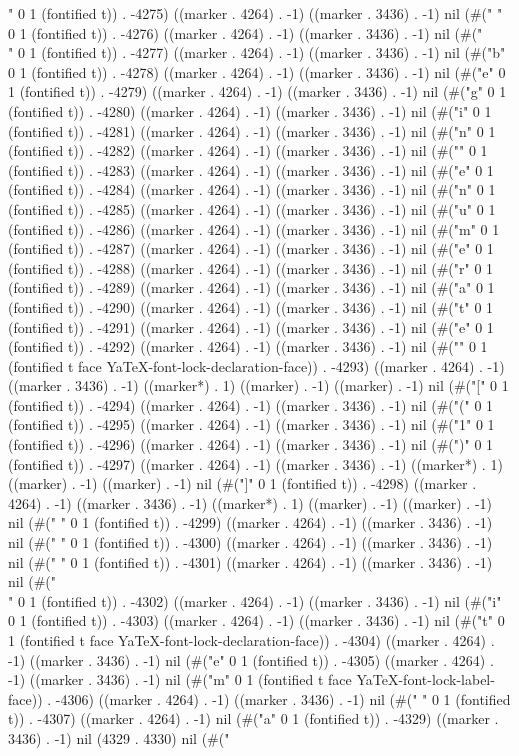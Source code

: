 " 0 1 (fontified t)) . -4275) ((marker . 4264) . -1) ((marker . 3436) . -1) nil (#(" " 0 1 (fontified t)) . -4276) ((marker . 4264) . -1) ((marker . 3436) . -1) nil (#("\\" 0 1 (fontified t)) . -4277) ((marker . 4264) . -1) ((marker . 3436) . -1) nil (#("b" 0 1 (fontified t)) . -4278) ((marker . 4264) . -1) ((marker . 3436) . -1) nil (#("e" 0 1 (fontified t)) . -4279) ((marker . 4264) . -1) ((marker . 3436) . -1) nil (#("g" 0 1 (fontified t)) . -4280) ((marker . 4264) . -1) ((marker . 3436) . -1) nil (#("i" 0 1 (fontified t)) . -4281) ((marker . 4264) . -1) ((marker . 3436) . -1) nil (#("n" 0 1 (fontified t)) . -4282) ((marker . 4264) . -1) ((marker . 3436) . -1) nil (#("{" 0 1 (fontified t)) . -4283) ((marker . 4264) . -1) ((marker . 3436) . -1) nil (#("e" 0 1 (fontified t)) . -4284) ((marker . 4264) . -1) ((marker . 3436) . -1) nil (#("n" 0 1 (fontified t)) . -4285) ((marker . 4264) . -1) ((marker . 3436) . -1) nil (#("u" 0 1 (fontified t)) . -4286) ((marker . 4264) . -1) ((marker . 3436) . -1) nil (#("m" 0 1 (fontified t)) . -4287) ((marker . 4264) . -1) ((marker . 3436) . -1) nil (#("e" 0 1 (fontified t)) . -4288) ((marker . 4264) . -1) ((marker . 3436) . -1) nil (#("r" 0 1 (fontified t)) . -4289) ((marker . 4264) . -1) ((marker . 3436) . -1) nil (#("a" 0 1 (fontified t)) . -4290) ((marker . 4264) . -1) ((marker . 3436) . -1) nil (#("t" 0 1 (fontified t)) . -4291) ((marker . 4264) . -1) ((marker . 3436) . -1) nil (#("e" 0 1 (fontified t)) . -4292) ((marker . 4264) . -1) ((marker . 3436) . -1) nil (#("}" 0 1 (fontified t face YaTeX-font-lock-declaration-face)) . -4293) ((marker . 4264) . -1) ((marker . 3436) . -1) ((marker*) . 1) ((marker) . -1) ((marker) . -1) nil (#("[" 0 1 (fontified t)) . -4294) ((marker . 4264) . -1) ((marker . 3436) . -1) nil (#("(" 0 1 (fontified t)) . -4295) ((marker . 4264) . -1) ((marker . 3436) . -1) nil (#("1" 0 1 (fontified t)) . -4296) ((marker . 4264) . -1) ((marker . 3436) . -1) nil (#(")" 0 1 (fontified t)) . -4297) ((marker . 4264) . -1) ((marker . 3436) . -1) ((marker*) . 1) ((marker) . -1) ((marker) . -1) nil (#("]" 0 1 (fontified t)) . -4298) ((marker . 4264) . -1) ((marker . 3436) . -1) ((marker*) . 1) ((marker) . -1) ((marker) . -1) nil (#("
" 0 1 (fontified t)) . -4299) ((marker . 4264) . -1) ((marker . 3436) . -1) nil (#(" " 0 1 (fontified t)) . -4300) ((marker . 4264) . -1) ((marker . 3436) . -1) nil (#(" " 0 1 (fontified t)) . -4301) ((marker . 4264) . -1) ((marker . 3436) . -1) nil (#("\\" 0 1 (fontified t)) . -4302) ((marker . 4264) . -1) ((marker . 3436) . -1) nil (#("i" 0 1 (fontified t)) . -4303) ((marker . 4264) . -1) ((marker . 3436) . -1) nil (#("t" 0 1 (fontified t face YaTeX-font-lock-declaration-face)) . -4304) ((marker . 4264) . -1) ((marker . 3436) . -1) nil (#("e" 0 1 (fontified t)) . -4305) ((marker . 4264) . -1) ((marker . 3436) . -1) nil (#("m" 0 1 (fontified t face YaTeX-font-lock-label-face)) . -4306) ((marker . 4264) . -1) ((marker . 3436) . -1) nil (#(" " 0 1 (fontified t)) . -4307) ((marker . 4264) . -1) nil (#("a" 0 1 (fontified t)) . -4329) ((marker . 3436) . -1) nil (4329 . 4330) nil (#("
